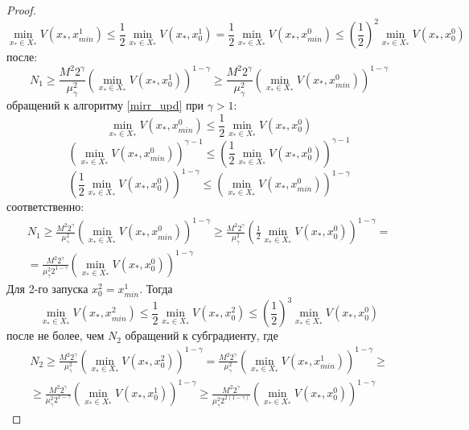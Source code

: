 \begin{proof}
       $$
           \min\limits_{x_* \in X_*}{V(x_*, x_{min}^1)} \leq \frac{1}{2} \min\limits_{x_* \in X_*}{V(x_*, x_0^1)} = \frac{1}{2} \min\limits_{x_* \in X_*}{V(x_*, x_{min}^0)} \leq \left(\frac{1}{2}\right)^2 \min\limits_{x_* \in X_*}{V(x_*, x_0^0)}
       $$
       после:
       $$
           N_1 \geq \frac{M^2 2^{\gamma}}{\mu_{\gamma}^2} \left(\min\limits_{x_* \in X_*}{V(x_*, x_0^1)}\right)^{1 - \gamma} \geq \frac{M^2 2^{\gamma}}{\mu_{\gamma}^2} \left(\min\limits_{x_* \in X_*}{V(x_*, x_{min}^0)}\right)^{1 - \gamma} 
       $$
       обращений к алгоритму \eqref{mirr_upd} при $\gamma > 1$:
       $$
           \min\limits_{x_* \in X_*}{V(x_*, x_{min}^0)} \leq \frac{1}{2}\min\limits_{x_* \in X_*}{V(x_*, x_0^0)}  
       $$
       $$
           \left(\min\limits_{x_* \in X_*}{V(x_*, x_{min}^0)}\right)^{\gamma - 1} \leq \left(\frac{1}{2} \min\limits_{x_* \in X_*}{V(x_*, x_0^0)}\right)^{\gamma - 1}
       $$
       $$
            \left(\frac{1}{2} \min\limits_{x_* \in X_*}{V(x_*, x_0^0)}\right)^{1 - \gamma} \leq \left(\min\limits_{x_* \in X_*}{V(x_*, x_{min}^0)}\right)^{1 - \gamma}
       $$
       соответственно:
       $$
       \begin{aligned}
           N_1 \geq \frac{M^2 2^{\gamma}}{\mu_{\gamma}^2} \left(\min\limits_{x_* \in X_*}{V(x_*, x_{min}^0)}\right)^{1 - \gamma} \geq \frac{M^2 2^{\gamma}}{\mu_{\gamma}^2} \left(\frac{1}{2} \min\limits_{x_* \in X_*}{V(x_*, x_0^0)}\right)^{1 - \gamma} =\\
           = \frac{M^2 2^{\gamma}}{\mu_{\gamma}^2 2^{1-\gamma}} \left(\min\limits_{x_* \in X_*}{V(x_*, x_0^0)}\right)^{1 - \gamma}
       \end{aligned}
       $$
       Для 2-го запуска $x_0^2 = x_{min}^1$. Тогда
       $$
           \min\limits_{x_* \in X_*}{V(x_*, x_{min}^2)} \leq \frac{1}{2} \min\limits_{x_* \in X_*}{V(x_*, x_0^2)} \leq (\frac{1}{2})^3 \min\limits_{x_* \in X_*}{V(x_*, x_0^0)} 
       $$
       после не более, чем $N_2$ обращений к субградиенту, где
       $$
       \begin{aligned}
           N_2 \geq \frac{M^2 2^{\gamma}}{\mu_{\gamma}^2} \left(\min\limits_{x_* \in X_*}{V(x_*, x_0^2)}\right)^{1 - \gamma} = \frac{M^2 2^{\gamma}}{\mu_{\gamma}^2} \left(\min\limits_{x_* \in X_*}{V(x_*, x_{min}^1)}\right)^{1 - \gamma} \geq\\
           \geq \frac{M^2 2^{\gamma}}{\mu_{\gamma}^2 2^{1 - \gamma}} \left(\min\limits_{x_* \in X_*}{V(x_*, x_0^1)}\right)^{1 - \gamma} \geq \frac{M^2 2^{\gamma}}{\mu_{\gamma}^2 2^{2(1 - \gamma)}} \left(\min\limits_{x_* \in X_*}{V(x_*, x_0^0)}\right)^{1 - \gamma}

\end{aligned}$$
\end{proof}
